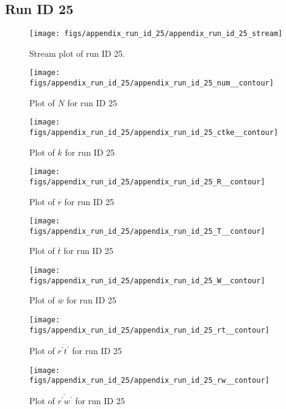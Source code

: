 \subsection{Run ID 25}
\begin{figure}[H]
\centering
\texttt{[image: figs/appendix\_run\_id\_25/appendix\_run\_id\_25\_stream]}
\caption{Stream plot of run ID 25.}
\label{fig:appendix_run_id_25_stream}
\end{figure}


\begin{figure}[H]
\centering
\texttt{[image: figs/appendix\_run\_id\_25/appendix\_run\_id\_25\_num\_\_contour]}
\caption{Plot of $N$ for run ID 25}
\label{fig:appendix_run_id_25_num__contour}
\end{figure}


\begin{figure}[H]
\centering
\texttt{[image: figs/appendix\_run\_id\_25/appendix\_run\_id\_25\_ctke\_\_contour]}
\caption{Plot of $k$ for run ID 25}
\label{fig:appendix_run_id_25_ctke__contour}
\end{figure}


\begin{figure}[H]
\centering
\texttt{[image: figs/appendix\_run\_id\_25/appendix\_run\_id\_25\_R\_\_contour]}
\caption{Plot of $\overline{r}$ for run ID 25}
\label{fig:appendix_run_id_25_R__contour}
\end{figure}


\begin{figure}[H]
\centering
\texttt{[image: figs/appendix\_run\_id\_25/appendix\_run\_id\_25\_T\_\_contour]}
\caption{Plot of $\overline{t}$ for run ID 25}
\label{fig:appendix_run_id_25_T__contour}
\end{figure}


\begin{figure}[H]
\centering
\texttt{[image: figs/appendix\_run\_id\_25/appendix\_run\_id\_25\_W\_\_contour]}
\caption{Plot of $\overline{w}$ for run ID 25}
\label{fig:appendix_run_id_25_W__contour}
\end{figure}


\begin{figure}[H]
\centering
\texttt{[image: figs/appendix\_run\_id\_25/appendix\_run\_id\_25\_rt\_\_contour]}
\caption{Plot of $\overline{r^\prime t^\prime}$ for run ID 25}
\label{fig:appendix_run_id_25_rt__contour}
\end{figure}


\begin{figure}[H]
\centering
\texttt{[image: figs/appendix\_run\_id\_25/appendix\_run\_id\_25\_rw\_\_contour]}
\caption{Plot of $\overline{r^\prime w^\prime}$ for run ID 25}
\label{fig:appendix_run_id_25_rw__contour}
\end{figure}


